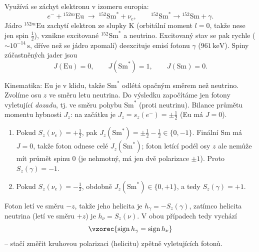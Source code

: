Využívá se záchyt elektronu v izomeru europia:
\[
  e^- + {}^{152m}\mathrm{Eu} \;\longrightarrow\; {}^{152}\mathrm{Sm}^* + \nu_e,
  \qquad {}^{152}\mathrm{Sm}^*\to {}^{152}\mathrm{Sm} + \gamma .
\]
Jádro \({}^{152m}\mathrm{Eu}\) zachytí elektron ze slupky K (orbitální moment \(l=0\), takže
nese jen spin \(\tfrac12\)), vznikne excitované \({}^{152}\mathrm{Sm}^*\) a neutrino. Excitovaný
stav se pak rychle (\(\sim 10^{-14}\,\mathrm{s}\), dříve než se jádro zpomalí) deexcituje
emisí fotonu \(\gamma\) (\(961\,\mathrm{keV}\)). Spiny zúčastněných jader jsou
\[
  J(\mathrm{Eu}) = 0,\qquad J(\mathrm{Sm}^*) = 1,\qquad J(\mathrm{Sm}) = 0 .
\]

\begin{center}
\end{center}

Kinematika: Eu je v klidu, takže \(\mathrm{Sm}^*\) odlétá opačným směrem než neutrino.
Zvolíme osu \(z\) ve směru letu neutrina. Do výsledku započítáme jen fotony vyletující
\emph{dozadu}, tj. ve směru pohybu \(\mathrm{Sm}^*\) (proti neutrinu). Bilance průmětu
momentu hybnosti \(J_z\): na začátku je \(J_z = s_z(e^-) = \pm\tfrac12\) (Eu má \(J=0\)).

\begin{enumerate}[label=\alph*)]
  \item Pokud \(S_z(\nu_e)=+\tfrac12\), pak \(J_z(\mathrm{Sm}^*) = \pm\tfrac12-\tfrac12\in\{0,-1\}\).
        Finální Sm má \(J=0\), takže foton odnese celé \(J_z(\mathrm{Sm}^*)\); foton letící
        podél osy \(z\) ale nemůže mít průmět spinu \(0\) (je nehmotný, má jen dvě
        polarizace \(\pm1\)). Proto \(S_z(\gamma)=-1\).
  \item Pokud \(S_z(\nu_e)=-\tfrac12\), obdobně \(J_z(\mathrm{Sm}^*)\in\{0,+1\}\), a tedy
        \(S_z(\gamma)=+1\).
\end{enumerate}
Foton letí ve směru \(-z\), takže jeho helicita je \(h_\gamma = -S_z(\gamma)\), zatímco helicita
neutrina (letí ve směru \(+z\)) je \(h_\nu = S_z(\nu)\). V obou případech tedy vychází
\[
  \vzorec{\operatorname{sign} h_\gamma = \operatorname{sign} h_\nu}
\]
-- stačí změřit kruhovou polarizaci (helicitu) zpětně vyletujících fotonů.

